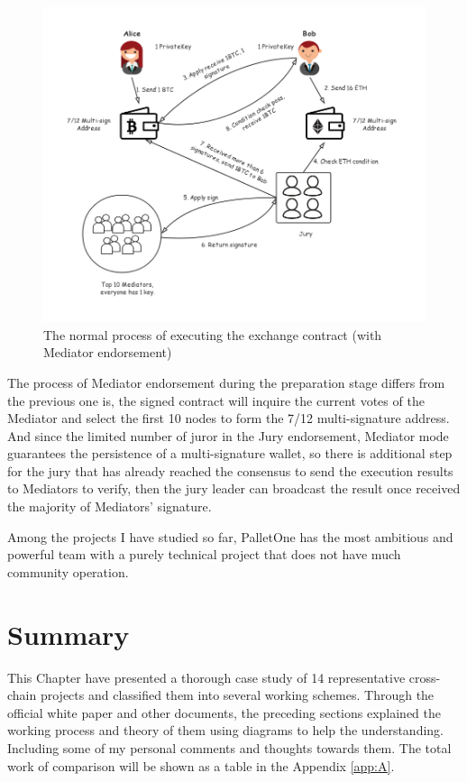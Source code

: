 \begin{figure}[H]
    \includegraphics[width=1\textwidth]{./figures/mediator.png}
    \centering
    \caption{The normal process of executing the exchange contract (with Mediator endorsement) \protect\footnotemark}
    \label{fig:mediator}
    \centering
\end{figure}
\noindent The process of Mediator endorsement during the preparation stage differs from the previous one is, the signed contract will inquire the current votes of the Mediator and select the first 10 nodes to form the 7/12 multi-signature address. And since the limited number of juror in the Jury endorsement, Mediator mode guarantees the persistence of a multi-signature wallet, so there is additional step for the jury that has already reached the consensus to send the execution results to Mediators to verify, then the jury leader can broadcast the result once received the majority of Mediators' signature.

\noindent Among the projects I have studied so far, PalletOne has the most ambitious and powerful team with a purely technical project that does not have much community operation.






\section{Summary}
\noindent This Chapter have presented a thorough case study of 14 representative cross-chain projects and classified them into several working schemes. Through the official white paper and other documents, the preceding sections explained the working process and theory of them using diagrams to help the understanding. Including some of my personal comments and thoughts towards them. The total work of comparison will be shown as a table in the Appendix \ref{app:A}.

